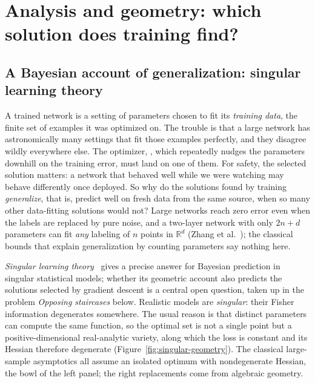 \section{Analysis and geometry: which solution does training find?}
\label{sec:analysis}

\subsection{A Bayesian account of generalization: singular learning theory}

A trained network is a setting of parameters chosen to fit its \emph{training data}, the finite set of examples it was optimized on. The trouble is that a large network has astronomically many settings that fit those examples perfectly, and they disagree wildly everywhere else. The optimizer, , which repeatedly nudges the parameters downhill on the training error, must land on one of them. For safety, the selected solution matters: a network that behaved well while we were watching may behave differently once deployed. So why do the solutions found by training \emph{generalize}, that is, predict well on fresh data from the same source, when so many other data-fitting solutions would not? Large networks reach zero error even when the labels are replaced by pure noise, and a two-layer network with only $2n+d$ parameters can fit \emph{any} labeling of $n$ points in $\mathbb{R}^d$ (Zhang et al.~\cite{zhang2017}); the classical bounds that explain generalization by counting parameters say nothing here.

\emph{Singular learning theory}~\cite{watanabe2009} gives a precise answer for Bayesian prediction in singular statistical models; whether its geometric account also predicts the solutions selected by gradient descent is a central open question, taken up in the problem \emph{Opposing staircases} below. Realistic models are \emph{singular}: their Fisher information degenerates somewhere. The usual reason is that distinct parameters can compute the same function, so the optimal set is not a single point but a positive-dimensional real-analytic variety, along which the loss is constant and its Hessian therefore degenerate (Figure~\ref{fig:singular-geometry}). The classical large-sample asymptotics all assume an isolated optimum with nondegenerate Hessian, the bowl of the left panel; the right replacements come from algebraic geometry.

